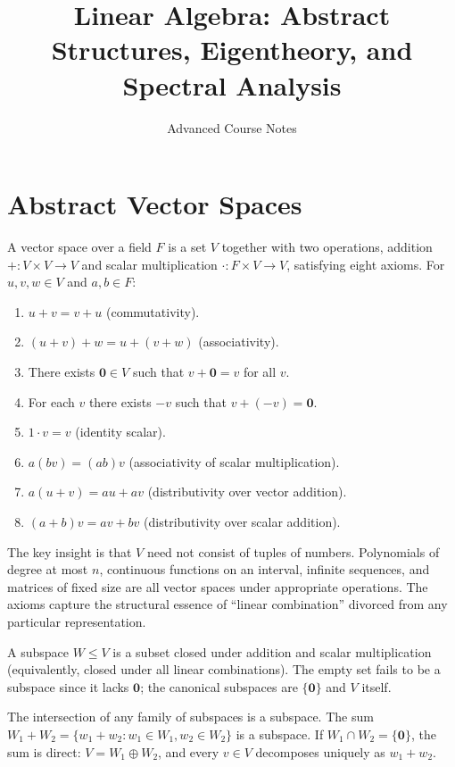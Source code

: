 \documentclass[11pt]{article}
\title{Linear Algebra: Abstract Structures, Eigentheory, and Spectral Analysis}
\author{Advanced Course Notes}
\date{}
\begin{document}
\maketitle

\section*{Abstract Vector Spaces}

A vector space over a field $F$ is a set $V$ together with two operations, addition $+: V \times V \to V$ and scalar multiplication $\cdot: F \times V \to V$, satisfying eight axioms. For $u, v, w \in V$ and $a, b \in F$:
\begin{enumerate}
  \item $u + v = v + u$ (commutativity).
  \item $(u + v) + w = u + (v + w)$ (associativity).
  \item There exists $\mathbf{0} \in V$ such that $v + \mathbf{0} = v$ for all $v$.
  \item For each $v$ there exists $-v$ such that $v + (-v) = \mathbf{0}$.
  \item $1 \cdot v = v$ (identity scalar).
  \item $a(bv) = (ab)v$ (associativity of scalar multiplication).
  \item $a(u + v) = au + av$ (distributivity over vector addition).
  \item $(a + b)v = av + bv$ (distributivity over scalar addition).
\end{enumerate}

The key insight is that $V$ need not consist of tuples of numbers. Polynomials of degree at most $n$, continuous functions on an interval, infinite sequences, and matrices of fixed size are all vector spaces under appropriate operations. The axioms capture the structural essence of ``linear combination'' divorced from any particular representation.

A subspace $W \leq V$ is a subset closed under addition and scalar multiplication (equivalently, closed under all linear combinations). The empty set fails to be a subspace since it lacks $\mathbf{0}$; the canonical subspaces are $\{\mathbf{0}\}$ and $V$ itself.

The intersection of any family of subspaces is a subspace. The sum $W_1 + W_2 = \{w_1 + w_2 : w_1 \in W_1, w_2 \in W_2\}$ is a subspace. If $W_1 \cap W_2 = \{\mathbf{0}\}$, the sum is direct: $V = W_1 \oplus W_2$, and every $v \in V$ decomposes uniquely as $w_1 + w_2$.
\end{document}
